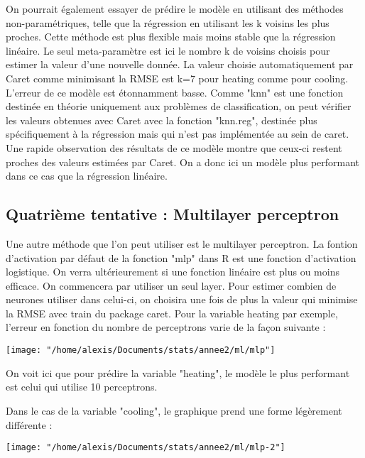 \documentclass[11pt,a4paper]{article}
\begin{document}
On pourrait également essayer de prédire le modèle en utilisant des méthodes non-paramétriques, telle que la régression en utilisant les k voisins les plus proches. Cette méthode est plus flexible mais moins stable que la régression linéaire. Le seul meta-paramètre est ici le nombre k de voisins choisis pour estimer la valeur d'une nouvelle donnée. La valeur choisie automatiquement par Caret comme minimisant la RMSE est k=7 pour heating comme pour cooling. L'erreur de ce modèle est étonnamment basse. Comme "knn" est une fonction destinée en théorie uniquement aux problèmes de classification, on peut vérifier les valeurs obtenues avec Caret avec la fonction "knn.reg", destinée plus spécifiquement à la régression mais qui n'est pas implémentée au sein de caret. Une rapide observation des résultats de ce modèle montre que ceux-ci restent proches des valeurs estimées par Caret. On a donc ici un modèle plus performant dans ce cas que la régression linéaire.

\subsection{Quatrième tentative : Multilayer perceptron}

Une autre méthode que l'on peut utiliser est le multilayer perceptron. La fontion d'activation par défaut de la fonction "mlp" dans R est une fonction d'activation logistique. On verra ultérieurement si une fonction linéaire est plus ou moins efficace. On commencera par utiliser un seul layer. Pour estimer combien de neurones utiliser dans celui-ci, on choisira une fois de plus la valeur qui minimise la RMSE avec train du package caret. Pour la variable heating par exemple, l'erreur en fonction du nombre de perceptrons varie de la façon suivante :

\begin{center}
\texttt{[image: "/home/alexis/Documents/stats/annee2/ml/mlp"]}
\end{center}

On voit ici que pour prédire la variable "heating", le modèle le plus performant est celui qui utilise 10 perceptrons.\bigskip

Dans le cas de la variable "cooling", le graphique prend une forme légèrement différente :

\begin{center}
\texttt{[image: "/home/alexis/Documents/stats/annee2/ml/mlp-2"]}
\end{center}
\end{document}
